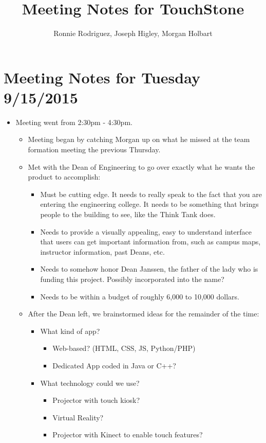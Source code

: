 \documentclass[]{article}
\title{Meeting Notes for TouchStone}
\author{Ronnie Rodriguez, Joseph Higley, Morgan Holbart}
\begin{document}
\maketitle

\section{Meeting Notes for Tuesday 9/15/2015}
	\begin{itemize}
		\item Meeting went from 2:30pm - 4:30pm.
	\begin{itemize}
		\item Meeting began by catching Morgan up on what he missed at the team formation meeting the previous Thursday.
		\item Met with the Dean of Engineering to go over exactly what he wants the product to accomplish:
			\begin{itemize}
				\item Must be cutting edge. It needs to really speak to the fact that you are entering the engineering college. It needs to be something that brings people to the building to see, like the Think Tank does.
				\item  Needs to provide a visually appealing, easy to understand interface that users can get important information from, such as campus maps, instructor information, past Deans, etc.
				\item Needs to somehow honor Dean Janssen, the father of the lady who is funding this project. Possibly incorporated into the name?
				\item Needs to be within a budget of roughly 6,000 to 10,000 dollars.
			\end{itemize}
		\item After the Dean left, we brainstormed ideas for the remainder of the time:
			\begin{itemize}
				\item What kind of app?
					\begin{itemize}
						\item Web-based? (HTML, CSS, JS, Python/PHP)
						\item Dedicated App coded in Java or C++?
					\end{itemize}
				\item What technology could we use?
					\begin{itemize}
						\item Projector with touch kiosk?
						\item Virtual Reality?
						\item Projector with Kinect to enable touch features?
					\end{itemize}
			\end{itemize}		
	\end{itemize}
	\end{itemize}
\end{document}
